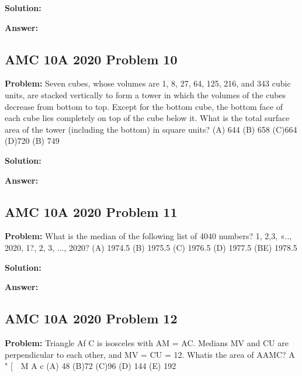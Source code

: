 \documentclass{article}
\newenvironment{problem}{\textbf{Problem: }}{\\}
\newenvironment{solution}{\textbf{Solution: }}{\\}
\newenvironment{answer}{\textbf{Answer: }}{\\}
\begin{document}
\begin{solution}
\end{solution}

\begin{answer}
\end{answer}

\subsection{AMC 10A 2020 Problem 10}

\begin{problem}
Seven cubes, whose volumes are 1, 8, 27, 64, 125, 216, and 343 cubic units, are stacked vertically to form a tower in which the volumes of the cubes decrease from bottom to top. Except for the bottom cube, the bottom face of each cube lies completely on top of the cube below it. What is the total surface area of the tower (including the bottom) in square units? (A) 644 (B) 658 (C)664 (D)720 (B) 749
\end{problem}

\begin{solution}
\end{solution}

\begin{answer}
\end{answer}

\subsection{AMC 10A 2020 Problem 11}

\begin{problem}
What is the median of the following list of 4040 numbers? 1, 2,3, «.., 2020, 1?, 2, 3, ..., 2020? (A) 1974.5 (B) 1975.5 (C) 1976.5 (D) 1977.5 (BE) 1978.5
\end{problem}

\begin{solution}
\end{solution}

\begin{answer}
\end{answer}

\subsection{AMC 10A 2020 Problem 12}

\begin{problem}
Triangle Af C is isosceles with AM = AC. Medians MV and CU are perpendicular to each other, and MV = CU = 12. Whatis the area of AAMC? A " [\ \ M A c (A) 48 (B)72 (C)96 (D) 144 (E) 192
\end{problem}
\end{document}
